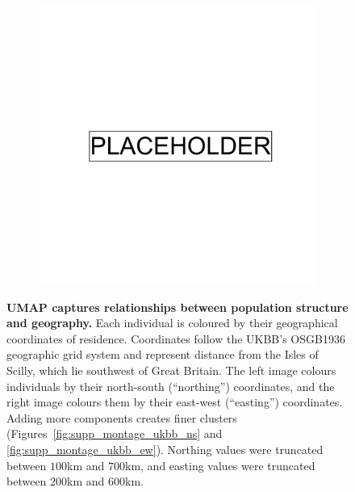 \clearpage

\begin{figure}
    \centering
    \begin{subfigure}{\columnwidth}
    \includegraphics[width=0.8\columnwidth]{placeholder.png}
    \caption{}
    \label{fig:umap_ukbb_geo_osgb}
    \end{subfigure}
      \caption[UMAP captures relationships between population structure and geography]{\textbf{UMAP captures relationships between population structure and geography.} Each individual is coloured by their geographical coordinates of residence. Coordinates follow the UKBB's OSGB1936 geographic grid system and represent distance from the Isles of Scilly, which lie southwest of Great Britain. The left image colours individuals by their north-south (``northing'') coordinates, and the right image colours them by their east-west (``easting'') coordinates. Adding more components creates finer clusters  (Figures~\ref{fig:supp_montage_ukbb_ns} and \ref{fig:supp_montage_ukbb_ew}). Northing values were truncated between $100$km and $700$km, and easting values were truncated between $200$km and $600$km.}
\label{fig:fig4}
\end{figure}

\clearpage

